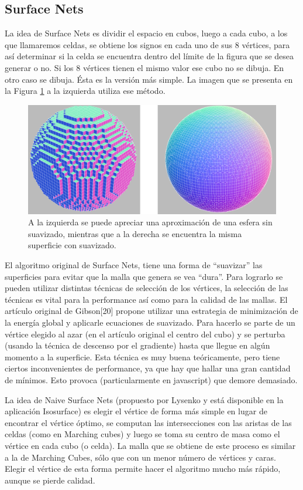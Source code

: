 \documentclass[12pt]{article}
\begin{document}
\subsection{Surface Nets}
\noindent La idea de Surface Nets es dividir el espacio en cubos, luego a cada cubo, a los que llamaremos celdas, se obtiene los signos en cada uno de sus 8 vértices, para así determinar si la celda se encuentra dentro del límite de la figura que se desea generar o no. Si los 8 vértices tienen el mismo valor ese cubo no se dibuja. En otro caso se dibuja. Ésta es la versión más simple. La imagen que se presenta en la Figura \ref{minecraft} a la izquierda utiliza ese método.
\begin{figure}[h]
\includegraphics[width =\linewidth,center]{snc.png}
\caption{ A la izquierda se puede apreciar una aproximación de una esfera sin suavizado, mientras que a la derecha se encuentra la misma superficie con suavizado.}
\label{minecraft}
\end{figure}

El algoritmo original de Surface Nets\cite{surfacenets}, tiene una forma de “suavizar” las superficies para evitar  que la malla que genera se vea “dura”. Para lograrlo se pueden utilizar distintas técnicas de selección de los vértices, la selección de las técnicas es vital para la performance así como para la calidad de las mallas. El artículo original de Gibson[20]  propone utilizar una estrategia de minimización de la energía global y aplicarle ecuaciones de suavizado. Para hacerlo se parte de un vértice elegido al azar (en el artículo original el centro del cubo)  y se perturba (usando la técnica de descenso por el gradiente) hasta que llegue en algún momento a la superficie. Esta técnica es muy buena teóricamente, pero tiene ciertos inconvenientes de performance, ya que hay que hallar una gran cantidad de mínimos. Esto provoca (particularmente en javascript) que demore demasiado.

La idea de Naive Surface Nets (propuesto por Lysenko\cite{mykola2} y está disponible en la aplicación Isosurface) es elegir el vértice de forma más simple  en lugar de encontrar el vértice óptimo, se computan las intersecciones con las aristas de las celdas (como en Marching cubes) y luego se toma su centro de masa como el vértice en cada cubo (o celda). La malla que se obtiene de este proceso es similar a la de Marching Cubes, sólo que con un menor número de vértices y caras. Elegir el vértice de esta forma permite hacer el algoritmo mucho más rápido, aunque se pierde calidad.
\end{document}

